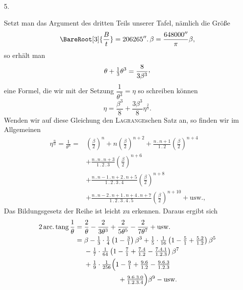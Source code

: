 \par\medskip
{}
\begin{center}5.\end{center}
\noindent\hspace*{\parindent}Setzt man das Argument des dritten Teils unserer Tafel, nämlich die Größe
\[
\BareRoot[3]{\frac{B}{t}}=206265''\mathpunct{.}\beta=\frac{648000''}{\pi}\beta,
\]
so erhält man
\[
\theta+\tfrac13\theta^3=\frac{8}{3\beta^3}\mathpunct{\raisebox{.45ex}{,}}
\]
eine Formel, die wir mit der Setzung \(\dfrac{1}{\theta^3}=\eta\) so schreiben können
\[
\eta=\frac{\beta^3}{8}+\frac{3\beta^3}{8}\eta^{\frac23}.
\]
Wenden wir auf diese Gleichung den \textsc{Lagrange}schen Satz an, so finden wir im Allgemeinen
\[
\begin{aligned}
\eta^{\frac n3}=\frac{1}{\theta^n}={}&\left(\frac{\beta}{2}\right)^n+n\left(\frac{\beta}{2}\right)^{n+2}
+\frac{n\mathpunct{.}n+1}{1\mathpunct{.}2}\left(\frac{\beta}{2}\right)^{n+4}\\
&+\frac{n\mathpunct{.}n\mathpunct{.}n+3}{1\mathpunct{.}2\mathpunct{.}3}\left(\frac{\beta}{2}\right)^{n+6}\\
&+\frac{n\mathpunct{.}n-1\mathpunct{.}n+2\mathpunct{.}n+5}{1\mathpunct{.}2\mathpunct{.}3\mathpunct{.}4}\left(\frac{\beta}{2}\right)^{n+8}\\
&+\frac{n\mathpunct{.}n-2\mathpunct{.}n+1\mathpunct{.}n+4\mathpunct{.}n+7}{1\mathpunct{.}2\mathpunct{.}3\mathpunct{.}4\mathpunct{.}5}\left(\frac{\beta}{2}\right)^{n+10}+\text{usw.,}
\end{aligned}
\]
Das Bildungsgesetz der Reihe ist leicht zu erkennen. Daraus ergibt sich
\[
\begin{aligned}
2\operatorname{arc.}\operatorname{tang}\frac1\theta
={}&\frac2\theta-\frac2{3\theta^3}+\frac2{5\theta^5}-\frac2{7\theta^7}+\text{usw.}\\
={}&\beta-\tfrac13\cdot\tfrac14\left(1-\tfrac31\right)\beta^3
+\tfrac15\cdot\tfrac1{16}\left(1-\tfrac51+\tfrac{5\mathpunct{.}2}{1\mathpunct{.}2}\right)\beta^5\\
&-\tfrac17\cdot\tfrac1{64}\left(1-\tfrac71+\tfrac{7\mathpunct{.}4}{1\mathpunct{.}2}-\tfrac{7\mathpunct{.}4\mathpunct{.}1}{1\mathpunct{.}2\mathpunct{.}3}\right)\beta^7\\
&+\tfrac19\cdot\tfrac1{256}\Bigl(1-\tfrac91+\tfrac{9\mathpunct{.}6}{1\mathpunct{.}2}-\tfrac{9\mathpunct{.}6\mathpunct{.}3}{1\mathpunct{.}2\mathpunct{.}3}\\
&\hspace{5em}+\tfrac{9\mathpunct{.}6\mathpunct{.}3\mathpunct{.}0}{1\mathpunct{.}2\mathpunct{.}3\mathpunct{.}4}\Bigr)\beta^9-\text{usw.}
\end{aligned}
\]
